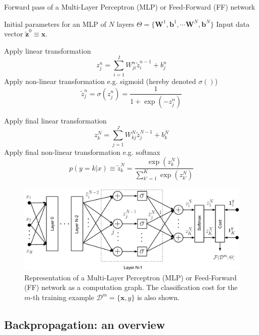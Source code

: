 \begin{algorithm}[th!]
   \caption{Forward pass of a Multi-Layer Perceptron (MLP) or Feed-Forward (FF) network}
\begin{algorithmic}[1]
\label{algo:mlpforward}

    Initial parameters for an MLP of $N$ layers $\Theta=\{\mathbf{W}^1, \mathbf{b}^1, \cdots \mathbf{W}^N, \mathbf{b}^N\}$
    Input data vector $\mathbf{\tilde{z}}^{0}  \equiv \mathbf{x}$.

     \STATE Apply  linear transformation
        $$z_j^n = \sum_{i=1}^{I} W_{ji}^n \tilde{z}_i^{n-1} + b_j^n$$
     \STATE Apply non-linear transformation e.g. sigmoid (hereby denoted $\sigma()$)
     $$\tilde{z}_j^n = \sigma(z_j^n)  = \frac{1}{1+\exp(-z_j^n)}$$

	\ENDFOR

\STATE Apply final linear transformation
   $$z_k^N = \sum_{j=1}^{J} W_{kj}^N \tilde{z}_j^{N-1} + b_k^N$$
\STATE Apply final non-linear transformation e.g. softmax
$$p(y=k|{x}) \equiv \tilde{z}_k^N = \frac{\exp(z_k^N)}{\sum_{k'=1}^{K} \exp(z_{k'}^N)}$$

\end{algorithmic}
\end{algorithm}

\begin{figure}[!hb]
\centering
\includegraphics[scale=0.6]{figs/deep_learning/NN2.pdf}
\caption{Representation of a Multi-Layer Perceptron (MLP) or Feed-Forward (FF) network as a computation graph. The classification cost
for the $m$-th training example $\mathcal{D}^m=\{\mathbf{x}, y\}$ is also
shown.}
\label{fig:FF}
\end{figure}

\subsection{Backpropagation: an overview}

